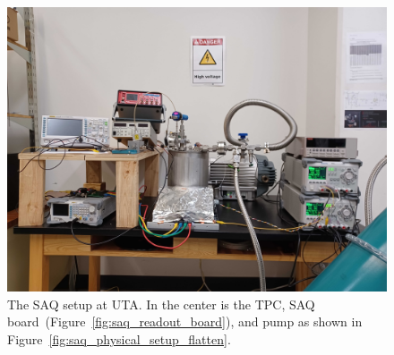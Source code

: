 \begin{figure}[]
\centering
\includegraphics[width=\textwidth]{images/SAQ_physical_setup.jpg}
\caption{The SAQ setup at UTA.
In the center is the TPC, SAQ board~(Figure~\ref{fig:saq_readout_board}), and pump as shown in Figure~\ref{fig:saq_physical_setup_flatten}.
}
\label{fig:saq_setup_flatten}
\end{figure}


